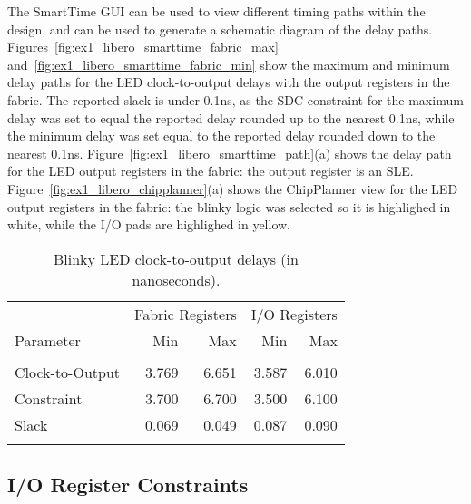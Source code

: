 The SmartTime GUI can be used to view different timing paths within the
design, and can be used to generate a schematic diagram of the delay paths.
%
Figures~\ref{fig:ex1_libero_smarttime_fabric_max}
and~\ref{fig:ex1_libero_smarttime_fabric_min} show the maximum and
minimum delay paths for the LED clock-to-output delays with the output
registers in the fabric.
The reported slack is under 0.1ns, as the SDC constraint for the maximum delay
was set to equal the reported delay rounded up to the nearest 0.1ns,
while the minimum delay was set equal to the reported delay rounded down
to the nearest 0.1ns.
%
Figure~\ref{fig:ex1_libero_smarttime_path}(a) shows the delay
path for the LED output registers in the fabric: the output register
is an SLE.
%
Figure~\ref{fig:ex1_libero_chipplanner}(a) shows the ChipPlanner
view for the LED output registers in the fabric: the blinky logic
was selected so it is highlighed in white, while the I/O pads
are highlighed in yellow.

\clearpage
%
\begin{table}
\caption{Blinky LED clock-to-output delays (in nanoseconds).}
\label{tab:ex1_tco}
\begin{center}
\begin{tabular}{|l||r|r||r|r|}
\hline
          & \multicolumn{2}{c||}{Fabric Registers} &
           \multicolumn{2}{c|}{I/O Registers}\\
\cline{2-5}
Parameter & Min & Max & Min & Max\\
\hline\hline
&\phantom{XXXX}&\phantom{XXXX}&\phantom{XXXX}&\phantom{XXXX}\\
Clock-to-Output & 3.769 & 6.651 &  3.587 & 6.010\\
Constraint      & 3.700 & 6.700 &  3.500 & 6.100\\
Slack           & 0.069 & 0.049 &  0.087 & 0.090\\
&&&&\\
\hline
\end{tabular}
\end{center}
\end{table}

\subsection{I/O Register Constraints}

